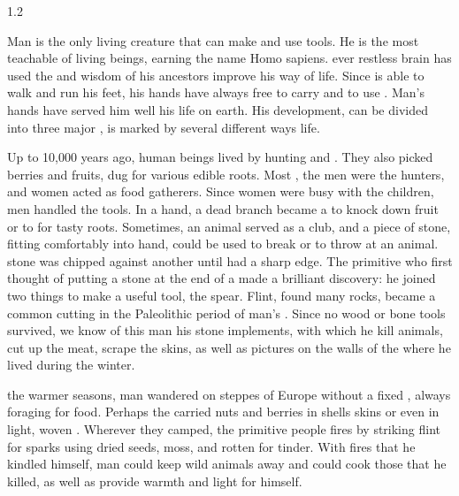 \vspace{0.1 cm}
\begin{spacing}{1.2}

Man is the only living creature that can make and use tools. He is the most teachable of living beings, earning the name Homo sapiens.  ever restless brain has used the  and wisdom of his ancestors  improve his way of life. Since  is able to walk and run  his feet, his hands have always  free to carry and to use . Man's hands have served him well  his life on earth. His development,  can be divided into three major , is marked by several different ways  life.

\vspace{0.5 cm}

Up to 10,000 years ago,  human beings lived by hunting and . They also picked berries and fruits,  dug for various edible roots. Most , the men were the hunters, and  women acted as food gatherers. Since  women were busy with the children,  men handled the tools. In a  hand, a dead branch became a  to knock down fruit or to  for tasty roots. Sometimes, an animal  served as a club, and a  piece of stone, fitting comfortably into  hand, could be used to break  or to throw at an animal.  stone was chipped against another until  had a sharp edge. The primitive  who first thought of putting a  stone at the end of a  made a brilliant discovery: he  joined two things to make a  useful tool, the spear. Flint, found  many rocks, became a common cutting  in the Paleolithic period of man's . Since no wood or bone tools  survived, we know of this man  his stone implements, with which he  kill animals, cut up the meat,  scrape the skins, as well as  pictures on the walls of the  where he lived during the winter.

\vspace{0.5 cm}

 the warmer seasons, man wandered on  steppes of Europe without a fixed , always foraging for food. Perhaps the  carried nuts and berries in shells  skins or even in light, woven . Wherever they camped, the primitive people  fires by striking flint for sparks  using dried seeds, moss, and rotten  for tinder. With fires that he kindled himself, man could keep wild animals away and could cook those that he killed, as well as provide warmth and light for himself.

\end{spacing}

